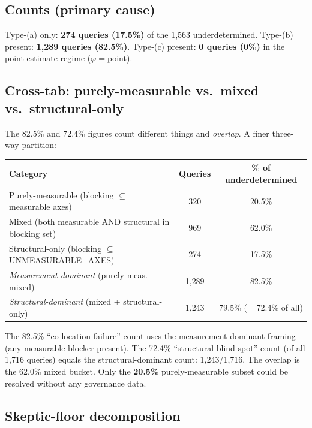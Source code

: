\documentclass{article} %
\begin{document}
\subsection*{Counts (primary cause)}
Type-(a) only: \textbf{274 queries (17.5\%)} of the 1{,}563 underdetermined.
Type-(b) present: \textbf{1{,}289 queries (82.5\%)}.
Type-(c) present: \textbf{0 queries (0\%)} in the point-estimate regime ($\varphi{=}$point).

\subsection*{Cross-tab: purely-measurable vs.\ mixed vs.\ structural-only}

The 82.5\% and 72.4\% figures count different things and \emph{overlap}. A finer three-way partition:

\begin{center}
\begin{tabular}{lcc}
\toprule
Category & Queries & \% of underdetermined \\
\midrule
Purely-measurable (blocking $\subseteq$ measurable axes) & 320 & 20.5\% \\
Mixed (both measurable AND structural in blocking set) & 969 & 62.0\% \\
Structural-only (blocking $\subseteq$ UNMEASURABLE\_AXES) & 274 & 17.5\% \\
\midrule
\emph{Measurement-dominant} (purely-meas.\ + mixed) & 1{,}289 & 82.5\% \\
\emph{Structural-dominant} (mixed + structural-only) & 1{,}243 & 79.5\% (= 72.4\% of all) \\
\bottomrule
\end{tabular}
\end{center}

The 82.5\% ``co-location failure'' count uses the measurement-dominant framing (any measurable blocker present). The 72.4\% ``structural blind spot'' count (of all 1{,}716 queries) equals the structural-dominant count: 1{,}243/1{,}716. The overlap is the 62.0\% mixed bucket. Only the \textbf{20.5\%} purely-measurable subset could be resolved without any governance data.

\subsection*{Skeptic-floor decomposition}
\end{document}
